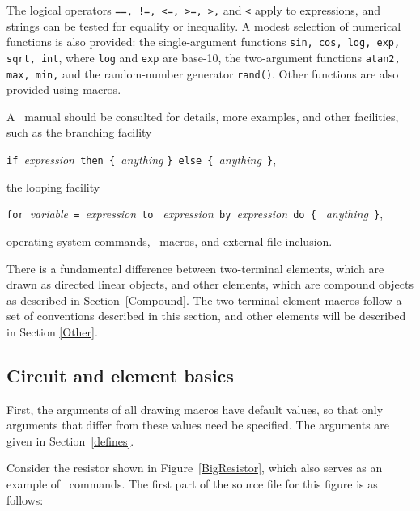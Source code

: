 The logical operators {\tt ==, !=, <=, >=, >,} and {\tt <} apply to
expressions, and strings can be tested for equality or inequality.  A
modest selection of numerical functions is also provided: the
single-argument functions {\tt sin, cos, log, exp, sqrt, int}, where
{\tt log} and {\tt exp} are base-10, the two-argument functions
{\tt atan2, max, min,} and the random-number generator {\tt rand()}.
Other functions are also provided using macros.

A \pic\ manual should be consulted for details, more examples, and
other facilities, such as the branching facility

\verb|if |{\sl expression}\verb| then { |{\sl anything} 
  \verb|} else { |{\sl anything}\verb| }|,

\noindent%
the looping facility

\verb|for |{\sl variable}\verb| = |{\sl expression}\verb| to |%
{\sl expression}\verb| by |{\sl expression}\verb| do { |%
{\sl anything}\verb| }|,

\noindent%
operating-system commands, \pic\ macros, and external file inclusion.

\label{Basictwo}
There is a fundamental difference between two-terminal elements, which
are drawn as directed linear objects, and other elements, which are
compound objects as described in Section~\ref{Compound}.  The
two-terminal element macros follow a set of conventions described in
this section, and other elements will be described in Section
\ref{Other}.

\subsection{Circuit and element basics}
First, the arguments of all drawing macros have default values, so that
only arguments that differ from these values need be specified.  The
arguments are given in Section~\ref{defines}.

Consider the resistor shown in Figure~\ref{BigResistor},
which also serves as an example of \pic\ commands.
The first part of the source file for this figure is as follows:

{\small  }

